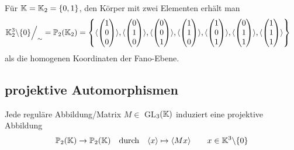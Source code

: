   \begin{bsp}
    Für $\mathbb K=\mathbb K_2 = \{0,1\}$, den Körper mit zwei Elementen erhält man
    \begin{align*}
      \mathbb K_2^3 \backslash \{0\} \Big/_\sim = \mathbb{P}_2(\mathbb K_2)
          & = \left\{ \langle \begin{pmatrix} 1 \\ 0 \\ 0 \end{pmatrix} \rangle,
                      \langle \begin{pmatrix} 0 \\ 1 \\ 0 \end{pmatrix} \rangle,
                      \langle \begin{pmatrix} 0 \\ 0 \\ 1 \end{pmatrix} \rangle,
                      \langle \begin{pmatrix} 1 \\ 1 \\ 0 \end{pmatrix} \rangle,
                      \langle \begin{pmatrix} 1 \\ 0 \\ 1 \end{pmatrix} \rangle,
                      \langle \begin{pmatrix} 0 \\ 1 \\ 1 \end{pmatrix} \rangle,
                      \langle \begin{pmatrix} 1 \\ 1 \\ 1 \end{pmatrix} \rangle
              \right\}
    \end{align*}
    als die homogenen Koordinaten der Fano-Ebene.
  \end{bsp}

\subsection*{projektive Automorphismen}

  \begin{defi}
    Jede reguläre Abbildung/Matrix $M\in$ GL$_3(\mathbb K)$ induziert eine projektive Abbildung
    \begin{align*}
      \mathbb{P}_2(\mathbb K) \rightarrow  \mathbb{P}_2(\mathbb K) \quad \mbox{durch} \quad
      \langle x \rangle \mapsto \langle Mx \rangle \qquad x \in \mathbb K^{3}\backslash\{0\}
    \end{align*}
  \end{defi}


